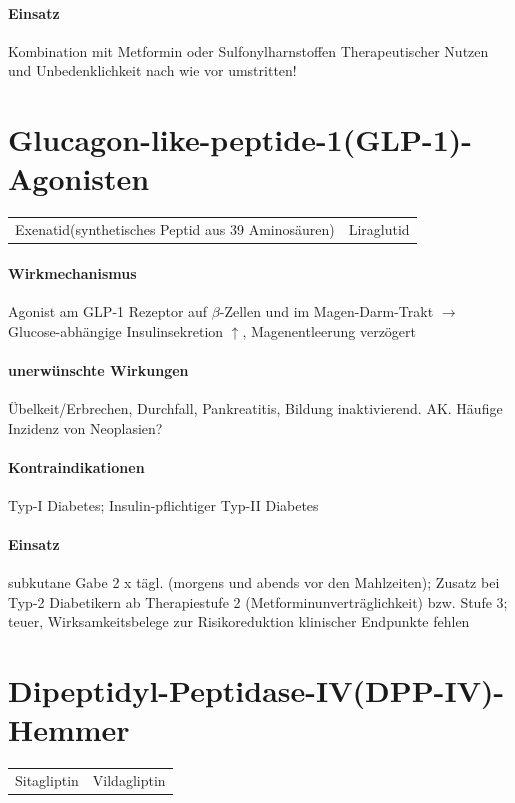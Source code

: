 \documentclass[10pt,a4paper]{report}
\begin{document}
\paragraph{Einsatz} %
\label{subp:einsatz}
Kombination mit Metformin oder Sulfonylharnstoffen 
Therapeutischer Nutzen und Unbedenklichkeit nach wie vor umstritten!
\section{Glucagon-like-peptide-1(GLP-1)-Agonisten} %
\label{sec:glucagon_like_peptide_1_glp_1_agonisten}
\begin{tabularx}{\textwidth}{XX}
Exenatid(synthetisches Peptid aus 39 Aminosäuren)&Liraglutid\\
\end{tabularx}
\paragraph{Wirkmechanismus} %
\label{subp:wirkmechanismus}
Agonist am GLP-1 Rezeptor auf $\beta$-Zellen und im Magen-Darm-Trakt $\rightarrow$ Glucose-abhängige Insulinsekretion $\uparrow$, Magenentleerung verzögert
\paragraph{unerwünschte Wirkungen} %
\label{subp:unerw_nschte_wirkungen}
Übelkeit/Erbrechen, Durchfall, Pankreatitis, Bildung inaktivierend. AK. Häufige Inzidenz von Neoplasien?
\paragraph{Kontraindikationen} %
\label{subp:kontraindikationen}
Typ-I Diabetes; Insulin-pflichtiger Typ-II Diabetes 
\paragraph{Einsatz} %
\label{subp:einsatz}
subkutane Gabe 2 x tägl. (morgens und abends vor den Mahlzeiten); Zusatz bei Typ-2 Diabetikern ab Therapiestufe 2 (Metforminunverträglichkeit) bzw. Stufe 3; teuer, Wirksamkeitsbelege zur Risikoreduktion klinischer Endpunkte fehlen 
\section{Dipeptidyl-Peptidase-IV(DPP-IV)-Hemmer} %
\label{sec:dipeptidyl_peptidase_iv_dpp_iv_hemmer}
\begin{tabularx}{\textwidth}{XX}
Sitagliptin&Vildagliptin\\
\end{tabularx}
\end{document}
